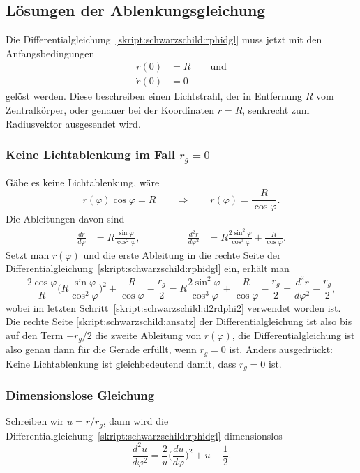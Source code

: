 \subsection{Lösungen der Ablenkungsgleichung}
Die Differentialgleichung~\eqref{skript:schwarzschild:rphidgl}
muss jetzt mit den Anfangsbedingungen
\begin{align*}
r(0)&= R\qquad\text{und}
\\
\dot r(0)&=0
\end{align*}
gelöst werden.
Diese beschreiben einen Lichtstrahl, der in Entfernung $R$ vom Zentralkörper,
oder genauer bei der Koordinaten $r=R$, senkrecht zum Radiusvektor
ausgesendet wird.

\subsubsection{Keine Lichtablenkung im Fall $r_g=0$}
Gäbe es keine Lichtablenkung, wäre 
\[
r(\varphi)\cos\varphi = R
\qquad\Rightarrow\qquad
r(\varphi)=\frac{R}{\cos\varphi}.
\]
Die Ableitungen davon sind
\begin{equation}
\begin{aligned}
\frac{dr}{d\varphi}
&=
R\frac{\sin \varphi}{\cos ^2\varphi},
\qquad
&
\qquad
\frac{d^2r}{d\varphi^2}
&=
R
\frac{2\sin ^2\varphi}{\cos ^3\varphi}+\frac{R}{\cos \varphi}.
\end{aligned}
\label{skript:schwarzschild:d2rdphi2}
\end{equation}
Setzt man $r(\varphi)$ und die erste Ableitung in die rechte Seite der
Differentialgleichung~\eqref{skript:schwarzschild:rphidgl}
ein, erhält man
\begin{equation}
\frac{2\cos\varphi}{R}\biggl(
R\frac{\sin\varphi}{\cos^2\varphi}
\biggr)^2
+\frac{R}{\cos\varphi}
-\frac{r_g}2
=
R\frac{2\sin^2\varphi}{\cos^3\varphi}+\frac{R}{\cos\varphi}
-\frac{r_g}2
=
\frac{d^2r}{d\varphi^2} - \frac{r_g}2,
\label{skript:schwarzschild:ansatz}
\end{equation}
wobei im letzten Schritt~\eqref{skript:schwarzschild:d2rdphi2}
verwendet worden ist.
Die rechte Seite \eqref{skript:schwarzschild:ansatz} der Differentialgleichung
ist also bis auf den Term $-r_g/2$ die zweite Ableitung von $r(\varphi)$,
die Differentialgleichung ist also genau dann für die Gerade erfüllt,
wenn $r_g=0$ ist.
Anders ausgedrückt:
Keine Lichtablenkung ist gleichbedeutend damit, dass $r_g=0$ ist.

\subsubsection{Dimensionslose Gleichung}
Schreiben wir $u=r/r_g$, dann wird die
Differentialgleichung~\eqref{skript:schwarzschild:rphidgl}
dimensionslos
\begin{equation}
\frac{d^2u}{d\varphi^2}
=
\frac{2}{u}
\biggl(\frac{du}{d\varphi}\biggr)^2+u-\frac12.
\label{skript:schwarzschild:udgl}
\end{equation}

